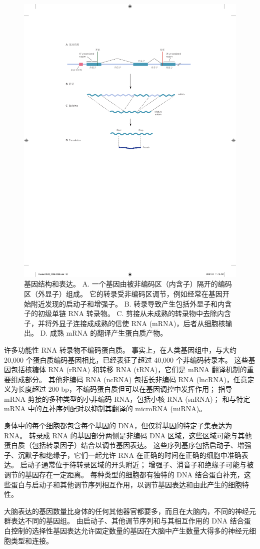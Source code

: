 \begin{figure}[htbp]
	\centering
	\includegraphics[width=0.5\linewidth]{chap02/fig_2_3}
	\caption{基因结构和表达。 
		A. 一个基因由被非编码区（内含子）隔开的编码区（外显子）组成。 
		它的转录受非编码区调节，例如经常在基因开始附近发现的启动子和增强子。 
		B. 转录导致产生包括外显子和内含子的初级单链 RNA 转录物。 
		C. 剪接从未成熟的转录物中去除内含子，并将外显子连接成成熟的信使 RNA (mRNA)，后者从细胞核输出。
		D. 成熟 mRNA 的翻译产生蛋白质产物。}
	\label{fig:2_3}
\end{figure}


许多功能性 RNA 转录物不编码蛋白质。 
事实上，在人类基因组中，与大约 20,000 个蛋白质编码基因相比，已经表征了超过 40,000 个非编码转录本。
这些基因包括核糖体 RNA (rRNA) 和转移 RNA (tRNA)，它们是 mRNA 翻译机制的重要组成部分。 
其他非编码 RNA (ncRNA) 包括长非编码 RNA (lncRNA)，任意定义为长度超过 200 bp，不编码蛋白质但可以在基因调控中发挥作用； 
指导 mRNA 剪接的多种类型的小非编码 RNA，包括小核 RNA (snRNA)； 
和与特定 mRNA 中的互补序列配对以抑制其翻译的 microRNA (miRNA)。


身体中的每个细胞都包含每个基因的 DNA，但仅将基因的特定子集表达为 RNA。 
转录成 RNA 的基因部分两侧是非编码 DNA 区域，这些区域可能与其他蛋白质（包括转录因子）结合以调节基因表达。 
这些序列基序包括启动子、增强子、沉默子和绝缘子，它们一起允许 RNA 在正确的时间在正确的细胞中准确表达。 
启动子通常位于待转录区域的开头附近； 增强子、消音子和绝缘子可能与被调节的基因存在一定距离。 
每种类型的细胞都有独特的 DNA 结合蛋白补充，这些蛋白与启动子和其他调节序列相互作用，以调节基因表达和由此产生的细胞特性。


大脑表达的基因数量比身体的任何其他器官都要多，而且在大脑内，不同的神经元群表达不同的基因组。 
由启动子、其他调节序列和与其相互作用的 DNA 结合蛋白控制的选择性基因表达允许固定数量的基因在大脑中产生数量大得多的神经元细胞类型和连接。


